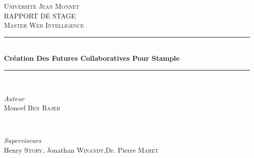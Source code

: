\documentclass[12pt]{article}
\begin{document}
\begin{titlepage}

\newcommand{\HRule}{\rule{\linewidth}{0.9mm}} %

\center %
 


\textsc{\LARGE Universite Jean Monnet}\\[1.5cm] %
\textsc{\Large RAPPORT DE STAGE}\\[0.5cm] %
\textsc{\large Master Web Intelligence}\\[0.5cm] %


\HRule \\[1.2cm]
{ \huge \bfseries Cr\'eation Des Futures Collaboratives Pour Stample}\\[1.6cm] %
\HRule \\[3cm]
 

\begin{minipage}{0.45\textwidth}
\begin{flushleft} \large
\emph{Auteur}\\
Moncef \textsc{Ben Rajeb} %
\end{flushleft}
\end{minipage}
~
\begin{minipage}{0.45\textwidth}
\begin{flushleft} \large
\emph{Superviseurs} \\
Henry \textsc{Story}, \newline 
Jonathan \textsc{Winandy},\newline Dr. Pierre \textsc{Maret} %


\end{flushleft}
\end{minipage}
\end{titlepage}
\end{document}
